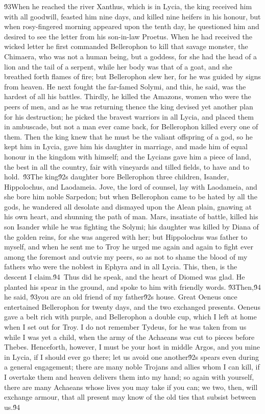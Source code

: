 {\'93When he reached the river Xanthus, which is in Lycia, the king received him with all goodwill, feasted him nine days, and killed nine heifers in his honour, but when rosy-fingered morning appeared upon the tenth day, he questioned him and desired to see the letter from his son-in-law Proetus. When he had received the wicked letter he first commanded Bellerophon to kill that savage monster, the Chimaera, who was not a human being, but a goddess, for she had the head of a lion and the tail of a serpent, while her body was that of a goat, and she breathed forth flames of fire; but Bellerophon slew her, for he was guided by signs from heaven. He next fought the far-famed Solymi, and this, he said, was the hardest of all his battles. Thirdly, he killed the Amazons, women who were the peers of men, and as he was returning thence the king devised yet another plan for his destruction; he picked the bravest warriors in all Lycia, and placed them in ambuscade, but not a man ever came back, for Bellerophon killed every one of them. Then the king knew that he must be the valiant offspring of a god, so he kept him in Lycia, gave him his daughter in marriage, and made him of equal honour in the kingdom with himself; and the Lycians gave him a piece of land, the best in all the country, fair with vineyards and tilled fields, to have and to hold.\
\'93The king\'92s daughter bore Bellerophon three children, Isander, Hippolochus, and Laodameia. Jove, the lord of counsel, lay with Laodameia, and she bore him noble Sarpedon; but when Bellerophon came to be hated by all the gods, he wandered all desolate and dismayed upon the Alean plain, gnawing at his own heart, and shunning the path of man. Mars, insatiate of battle, killed his son Isander while he was fighting the Solymi; his daughter was killed by Diana of the golden reins, for she was angered with her; but Hippolochus was father to myself, and when he sent me to Troy he urged me again and again to fight ever among the foremost and outvie my peers, so as not to shame the blood of my fathers who were the noblest in Ephyra and in all Lycia. This, then, is the descent I claim.\'94\
Thus did he speak, and the heart of Diomed was glad. He planted his spear in the ground, and spoke to him with friendly words. \'93Then,\'94 he said, \'93you are an old friend of my father\'92s house. Great Oeneus once entertained Bellerophon for twenty days, and the two exchanged presents. Oeneus gave a belt rich with purple, and Bellerophon a double cup, which I left at home when I set out for Troy. I do not remember Tydeus, for he was taken from us while I was yet a child, when the army of the Achaeans was cut to pieces before Thebes. Henceforth, however, I must be your host in middle Argos, and you mine in Lycia, if I should ever go there; let us avoid one another\'92s spears even during a general engagement; there are many noble Trojans and allies whom I can kill, if I overtake them and heaven delivers them into my hand; so again with yourself, there are many Achaeans whose lives you may take if you can; we two, then, will exchange armour, that all present may know of the old ties that subsist between us.\'94\
}
